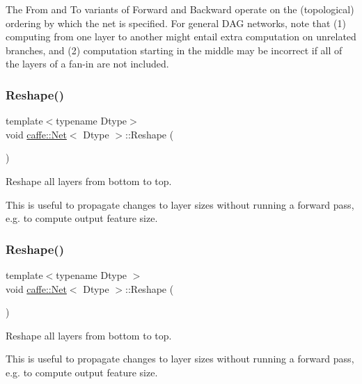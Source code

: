 The From and To variants of Forward and Backward operate on the (topological) ordering by which the net is specified. For general D\+AG networks, note that (1) computing from one layer to another might entail extra computation on unrelated branches, and (2) computation starting in the middle may be incorrect if all of the layers of a fan-\/in are not included. \mbox{\label{classcaffe_1_1_net_a8417af82aa83be45d39aab735bdead1d}} 
\subsubsection{\texorpdfstring{Reshape()}{Reshape()}\hspace{0.1cm}{\footnotesize\ttfamily [1/2]}}
{\footnotesize\ttfamily template$<$typename Dtype$>$ \\
void \mbox{\hyperlink{classcaffe_1_1_net}{caffe\+::\+Net}}$<$ Dtype $>$\+::Reshape (\begin{DoxyParamCaption}{ }\end{DoxyParamCaption})}



Reshape all layers from bottom to top. 

This is useful to propagate changes to layer sizes without running a forward pass, e.\+g. to compute output feature size. \mbox{\label{classcaffe_1_1_net_a8417af82aa83be45d39aab735bdead1d}} 
\subsubsection{\texorpdfstring{Reshape()}{Reshape()}\hspace{0.1cm}{\footnotesize\ttfamily [2/2]}}
{\footnotesize\ttfamily template$<$typename Dtype $>$ \\
void \mbox{\hyperlink{classcaffe_1_1_net}{caffe\+::\+Net}}$<$ Dtype $>$\+::Reshape (\begin{DoxyParamCaption}{ }\end{DoxyParamCaption})}



Reshape all layers from bottom to top. 

This is useful to propagate changes to layer sizes without running a forward pass, e.\+g. to compute output feature size. \mbox{\label{classcaffe_1_1_net_a4850fdb3eea1b04c97642546c0dcccf7}} 
